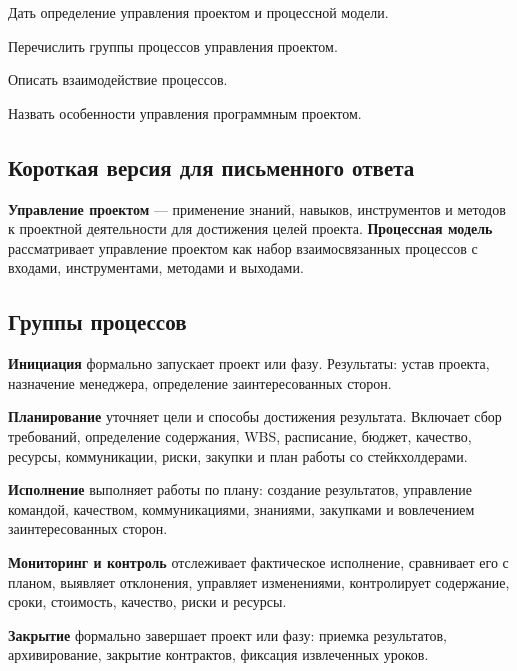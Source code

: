 
\begin{examplan}
    \item Дать определение управления проектом и процессной модели.
    \item Перечислить группы процессов управления проектом.
    \item Описать взаимодействие процессов.
    \item Назвать особенности управления программным проектом.
\end{examplan}

\subsection*{Короткая версия для письменного ответа}

\textbf{Управление проектом} --- применение знаний, навыков, инструментов и методов к проектной деятельности для достижения целей проекта. \textbf{Процессная модель} рассматривает управление проектом как набор взаимосвязанных процессов с входами, инструментами, методами и выходами.

\subsection*{Группы процессов}

\textbf{Инициация} формально запускает проект или фазу. Результаты: устав проекта, назначение менеджера, определение заинтересованных сторон.

\textbf{Планирование} уточняет цели и способы достижения результата. Включает сбор требований, определение содержания, WBS, расписание, бюджет, качество, ресурсы, коммуникации, риски, закупки и план работы со стейкхолдерами.

\textbf{Исполнение} выполняет работы по плану: создание результатов, управление командой, качеством, коммуникациями, знаниями, закупками и вовлечением заинтересованных сторон.

\textbf{Мониторинг и контроль} отслеживает фактическое исполнение, сравнивает его с планом, выявляет отклонения, управляет изменениями, контролирует содержание, сроки, стоимость, качество, риски и ресурсы.

\textbf{Закрытие} формально завершает проект или фазу: приемка результатов, архивирование, закрытие контрактов, фиксация извлеченных уроков.

